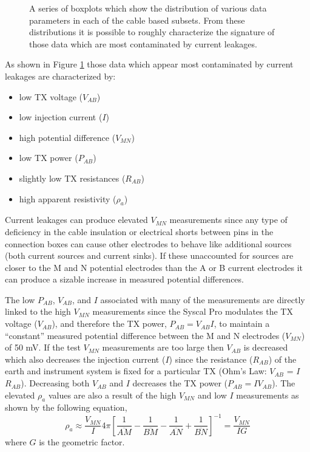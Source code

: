 \documentclass[final,authoryear,5p,times,twocolumn]{elsarticle}
\begin{document}
\begin{figure} [!ht]
\begin{center}
{       } %
    \end{center}
\caption{A series of boxplots which show the distribution of various data parameters in each of the cable based subsets. From these distributions it is possible to roughly characterize the signature of those data which are most contaminated by current leakages.}
\label{fig:CableSplit_Cluster_PropBoxPlots}
\end{figure}

As shown in Figure \ref{fig:CableSplit_Cluster_PropBoxPlots} those data which appear most contaminated by current leakages are characterized by:
\begin{itemize}
	\item{low TX voltage ($V_{AB}$)}
	\item{low injection current ($I$)}
	\item{high potential difference ($V_{MN}$)}
	\item{low TX power ($P_{AB}$)}
	\item{slightly low TX resistances ($R_{AB}$)}
	\item{high apparent resistivity ($\rho_{a}$)}
\end{itemize}
Current leakages can produce elevated $V_{MN}$ measurements since any type of deficiency in the cable insulation or electrical shorts between pins in the connection boxes can cause other electrodes to behave like additional sources (both current sources and current sinks). If these unaccounted for sources are closer to the M and N potential electrodes than the A or B current electrodes it can produce a sizable increase in measured potential differences.

The low $P_{AB}$, $V_{AB}$, and $I$ associated with many of the measurements are directly linked to the high $V_{MN}$ measurements since the Syscal Pro modulates the TX voltage ($V_{AB}$), and therefore the TX power, $P_{AB} = V_{AB} I$, to maintain a ``constant'' measured potential difference between the M and N electrodes ($V_{MN}$) of 50 mV. If the test $V_{MN}$ measurements are too large then $V_{AB}$ is decreased which also decreases the injection current ($I$) since the resistance ($R_{AB}$) of the earth and instrument system is fixed for a particular TX (Ohm's Law: $V_{AB}$ = $I$ $R_{AB}$). Decreasing both $V_{AB}$ and $I$ decreases the TX power ($P_{AB} = I V_{AB}$). The elevated $\rho_{a}$ values are also a result of the high $V_{MN}$ and low $I$ measurements as shown by the following equation,
\begin{equation}
 \rho_{a} \approx \frac{V_{MN}}{I} 4 \pi \left[ \frac{1}{\overline{AM}} - \frac{1}{\overline{BM}} - \frac{1}{\overline{AN}} + \frac{1}{\overline{BN}} \right]^{-1} = \frac{V_{MN}}{IG}
\end{equation}
where $G$ is the geometric factor.
\end{document}
